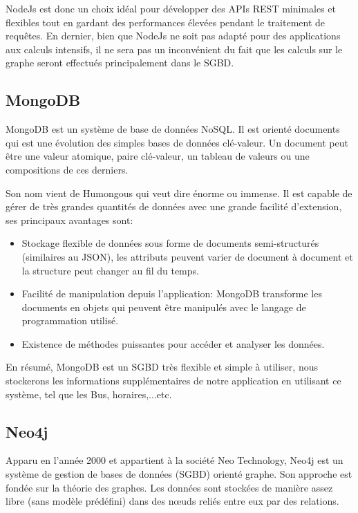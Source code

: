 NodeJs est donc un choix idéal pour développer des APIs REST minimales et flexibles tout en gardant des performances élevées pendant le traitement de requêtes.\newline
En dernier, bien que NodeJs ne soit pas adapté pour des applications aux calculs intensifs, il ne sera pas un inconvénient du fait que les calculs sur le graphe seront effectués principalement dans le SGBD.
\subsection{MongoDB}
	MongoDB \cite{MongoDB} est un système de base de données NoSQL. Il est orienté documents qui est une évolution des simples bases de données clé-valeur. Un document peut être une valeur atomique, paire clé-valeur, un tableau de valeurs ou une compositions de ces derniers.

Son nom vient de Humongous qui veut dire énorme ou immense. Il est capable de gérer de très grandes quantités de données avec une grande facilité d'extension, ses principaux avantages sont:

\begin{itemize}
	\item Stockage flexible de données sous forme de documents semi-structurés (similaires au JSON), les attributs peuvent varier de document à document et la structure peut changer au fil du temps.
	\item Facilité de manipulation depuis l'application: MongoDB transforme les documents en objets qui peuvent être manipulés avec le langage de programmation utilisé.
	\item Existence de méthodes puissantes pour accéder et analyser les données.
\end{itemize}

En résumé, MongoDB est un SGBD très flexible et simple à utiliser, nous stockerons les informations supplémentaires de notre application en utilisant ce système, tel que les Bus, horaires,...etc.

\subsection{Neo4j}
Apparu en l'année 2000 et appartient à la société Neo Technology, Neo4j est un système de gestion de bases de données (SGBD) orienté graphe. Son approche est fondée sur la théorie des graphes. Les données sont stockées de manière assez libre (sans modèle prédéfini) dans des nœuds reliés entre eux par des relations.

